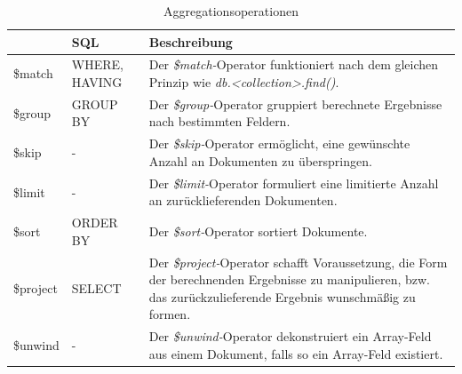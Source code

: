\begin{table}[H]
\centering
\begin{tabular}{lp{2.3cm}p{10.3cm}}
\toprule 
    \rowcolor{gray!50}
	\mongo & SQL & Beschreibung\\
	\midrule
	\$match & WHERE, HAVING & Der \textit{\$match-}Operator funktioniert nach dem gleichen Prinzip wie \textit{db.<collection>.find({})}.\\
	\$group & GROUP BY & Der \textit{\$group-}Operator gruppiert berechnete Ergebnisse nach bestimmten Feldern.\\
	\$skip & - & Der \textit{\$skip-}Operator ermöglicht, eine gewünschte Anzahl an Dokumenten zu überspringen.\\
	\$limit & - & Der \textit{\$limit-}Operator formuliert eine limitierte Anzahl an zurücklieferenden Dokumenten.\\
	\$sort & ORDER BY & Der \textit{\$sort-}Operator sortiert Dokumente.\\
	\$project  & SELECT & Der \textit{\$project-}Operator schafft Voraussetzung, die Form der berechnenden Ergebnisse zu manipulieren, bzw. das zurückzulieferende Ergebnis wunschmäßig zu formen.\\
	\$unwind  & - & Der \textit{\$unwind-}Operator dekonstruiert ein Array-Feld aus einem Dokument, falls so ein Array-Feld existiert.\\
	\bottomrule
\end{tabular}
\caption[Aggregationsoperationen]{Aggregationsoperationen}
\label{table:aggrOperators}
\end{table}

